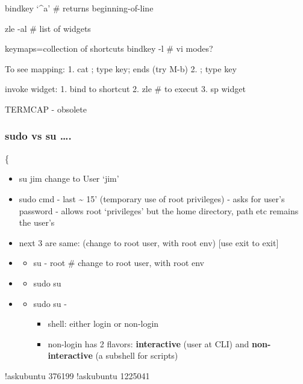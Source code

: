 \documentclass[
  letterpaper,
  DIV=11,
  numbers=noendperiod]{scrartcl}
\providecommand{\tightlist}{%
  \setlength{\itemsep}{0pt}\setlength{\parskip}{0pt}}\usepackage{longtable,booktabs,array}
\begin{document}
bindkey `\^{}a' \# returns beginning-of-line

zle -al \# list of widgets

keymaps=collection of shortcuts bindkey -l \# vi modes?

To see mapping: 1. cat ; type key; ends (try M-b) 2. ; type key

invoke widget: 1. bind to shortcut 2. zle \# to execut 3. sp widget

TERMCAP - obsolete

\subsubsection{sudo vs su \ldots.}\label{sudo-vs-su-.}

\{

\begin{itemize}
\item
  su jim change to User `jim'
\item
  sudo cmd - last \textasciitilde{} 15' (temporary use of root
  privileges) - asks for user's password - allows root `privileges' but
  the home directory, path etc remains the user's
\item
  next 3 are same: (change to root user, with root env) {[}use exit to
  exit{]}
\item
  \begin{itemize}
  \tightlist
  \item
    su - root \# change to root user, with root env
  \end{itemize}
\item
  \begin{itemize}
  \tightlist
  \item
    sudo su
  \end{itemize}
\item
  \begin{itemize}
  \item
    sudo su -

    \begin{itemize}
    \tightlist
    \item
      shell: either login or non-login
    \item
      non-login has 2 flavors: \textbf{interactive} (user at CLI) and
      \textbf{non-interactive} (a subshell for scripts)
    \end{itemize}
  \end{itemize}
\end{itemize}

!askubuntu 376199 !askubuntu 1225041
\end{document}
